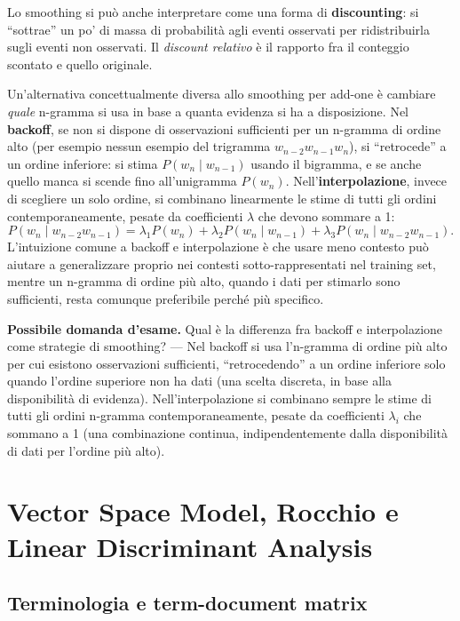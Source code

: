 \documentclass[11pt,a4paper]{report}
\newcommand{\domandaesame}[1]{\begin{esame}\textbf{Possibile domanda d'esame.} #1\end{esame}}
\begin{document}
Lo smoothing si può anche interpretare come una forma di \textbf{discounting}: si ``sottrae'' un po' di massa di probabilità agli eventi osservati per ridistribuirla sugli eventi non osservati. Il \emph{discount relativo} è il rapporto fra il conteggio scontato e quello originale.

Un'alternativa concettualmente diversa allo smoothing per add-one è cambiare \emph{quale} n-gramma si usa in base a quanta evidenza si ha a disposizione. Nel \textbf{backoff}, se non si dispone di osservazioni sufficienti per un n-gramma di ordine alto (per esempio nessun esempio del trigramma $w_{n-2}w_{n-1}w_n$), si ``retrocede'' a un ordine inferiore: si stima $P(w_n \mid w_{n-1})$ usando il bigramma, e se anche quello manca si scende fino all'unigramma $P(w_n)$. Nell'\textbf{interpolazione}, invece di scegliere un solo ordine, si combinano linearmente le stime di tutti gli ordini contemporaneamente, pesate da coefficienti $\lambda$ che devono sommare a 1:
\[
P(w_n \mid w_{n-2}w_{n-1}) = \lambda_1 P(w_n) + \lambda_2 P(w_n \mid w_{n-1}) + \lambda_3 P(w_n \mid w_{n-2}w_{n-1}).
\]
L'intuizione comune a backoff e interpolazione è che usare meno contesto può aiutare a generalizzare proprio nei contesti sotto-rappresentati nel training set, mentre un n-gramma di ordine più alto, quando i dati per stimarlo sono sufficienti, resta comunque preferibile perché più specifico.

\domandaesame{Qual è la differenza fra backoff e interpolazione come strategie di smoothing? --- Nel backoff si usa l'n-gramma di ordine più alto per cui esistono osservazioni sufficienti, ``retrocedendo'' a un ordine inferiore solo quando l'ordine superiore non ha dati (una scelta discreta, in base alla disponibilità di evidenza). Nell'interpolazione si combinano sempre le stime di tutti gli ordini n-gramma contemporaneamente, pesate da coefficienti $\lambda_i$ che sommano a 1 (una combinazione continua, indipendentemente dalla disponibilità di dati per l'ordine più alto).}

\chapter{Vector Space Model, Rocchio e Linear Discriminant Analysis}

\section{Terminologia e term-document matrix}
\end{document}
